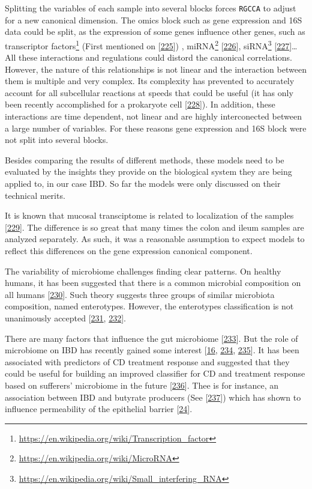 \documentclass[
  a4paper,
]{book}
\DeclareRobustCommand{\href}[2]{#2\footnote{\url{#1}}}
\begin{document}
Splitting the variables of each sample into several blocks forces \texttt{RGCCA} to adjust for a new canonical dimension.
The omics block such as gene expression and 16S data could be split, as the expression of some genes influence other genes, such as \href{https://en.wikipedia.org/wiki/Transcription_factor}{transcriptor factors} (First mentioned on {[}\protect\hyperlink{ref-stillman1984}{225}{]}) , \href{https://en.wikipedia.org/wiki/MicroRNA}{miRNA} {[}\protect\hyperlink{ref-lee1993}{226}{]}, \href{https://en.wikipedia.org/wiki/Small_interfering_RNA}{siRNA} {[}\protect\hyperlink{ref-hamilton1999}{227}{]}\ldots{} All these interactions and regulations could distord the canonical correlations.
However, the nature of this relationships is not linear and the interaction between them is multiple and very complex.
Its complexity has prevented to accurately account for all subcellular reactions at speeds that could be useful (it has only been recently accomplished for a prokaryote cell {[}\protect\hyperlink{ref-thornburg2022}{228}{]}).
In addition, these interactions are time dependent, not linear and are highly interconected between a large number of variables.
For these reasons gene expression and 16S block were not split into several blocks.

Besides comparing the results of different methods, these models need to be evaluated by the insights they provide on the biological system they are being applied to, in our case IBD.
So far the models were only discussed on their technical merits.

It is known that mucosal transciptome is related to localization of the samples {[}\protect\hyperlink{ref-criss2021}{229}{]}.
The difference is so great that many times the colon and ileum samples are analyzed separately.
As such, it was a reasonable assumption to expect models to reflect this differences on the gene expression canonical component.

The variability of microbiome challenges finding clear patterns.
On healthy humans, it has been suggested that there is a common microbial composition on all humans {[}\protect\hyperlink{ref-arumugam2011}{230}{]}. Such theory suggests three groups of similar microbiota composition, named enterotypes. However, the enterotypes classification is not unanimously accepted {[}\protect\hyperlink{ref-koren2013}{231}, \protect\hyperlink{ref-cheng2019}{232}{]}.

There are many factors that influence the gut microbiome {[}\protect\hyperlink{ref-hasan2019}{233}{]}. But the role of microbiome on IBD has recently gained some interest {[}\protect\hyperlink{ref-khanna2014}{16}, \protect\hyperlink{ref-bringiotti2014}{234}, \protect\hyperlink{ref-lloyd-price2019}{235}{]}.
It has been associated with predictors of CD treatment response and suggested that they could be useful for building an improved classifier for CD and treatment response based on sufferers' microbiome in the future {[}\protect\hyperlink{ref-douglas2018}{236}{]}.
Thee is for instance, an association between IBD and butyrate producers (See {[}\protect\hyperlink{ref-takahashi2016}{237}{]}) which has shown to influence permeability of the epithelial barrier {[}\protect\hyperlink{ref-ferrer-picuxf3n2020}{24}{]}.
\end{document}
